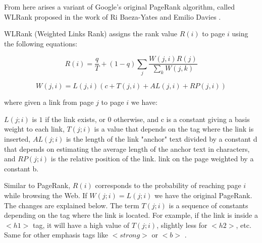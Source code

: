 From here arises a variant of Google's original PageRank algorithm, called WLRank proposed in the work of Ri Baeza-Yates and Emilio Davies \cite{baeza2004web}.

WLRank (Weighted Links Rank) assigns the rank value $R(i)$ to page $i$ using the following equations:

\begin{equation} 
	\label{eqn:ecuacionWLRank2} 
	R(i) = \frac{q}{T} + (1 - q) \sum_{j} \frac{W(j,i)R(j)}{\sum_{k}W(j,k)} 
\end{equation}

\begin{equation} 
	\label{eqn:ecuacionWLRank3} 
	W(j,i) = L(j,i)(c+T(j,i)+AL(j,i)+RP(j,i))
\end{equation}

where given a link from page $j$ to page $i$ we have:

$L(j; i)$ is $1$ if the link exists, or $0$ otherwise, and c is a constant giving a basis weight to each link,
$T(j; i)$ is a value that depends on the tag where the link is inserted,
$AL(j;i)$ is the length of the link "anchor" text divided by a constant d that depends on estimating the average length of the anchor text in characters, and $RP(j;i)$ is the relative position of the link. link on the page weighted by a constant b.


Similar to PageRank, $R(i)$ corresponds to the probability of reaching page $i$ while browsing the Web. If $W(j; i) = L(j; i)$ we have the original PageRank. The changes are explained below. The term $T(j; i)$ is a sequence of constants depending on the tag where the link is located. For example, if the link is inside a $<h1>$ tag, it will have a high value of $T(j; i)$, slightly less for $<h2>$, etc. Same for other emphasis tags like $<strong>$ or $<b>$ .

